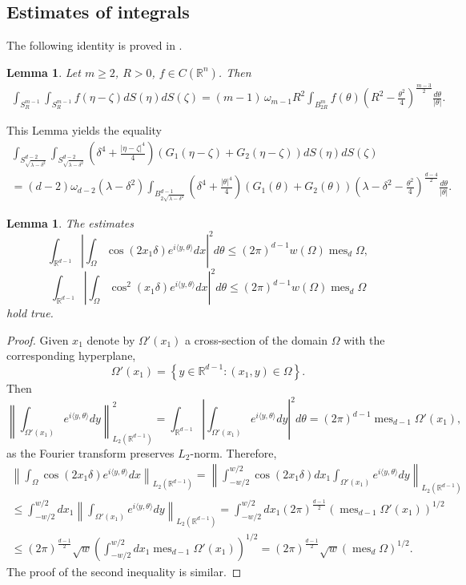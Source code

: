 \documentclass[a4paper,12pt]{article}
\numberwithin{equation}{section}
\def \de{\delta}
\def \ze{\zeta}
\def \la{\lambda}
\def \te{\theta}
\def \oo{\omega}
\def \O{\Omega}
\def \R{\mathbb{R}}
\def\mes{\operatorname{mes}}
\newcommand{\<}{\langle}
\renewcommand{\>}{\rangle}
\theoremstyle{plain}
\newtheorem{lemma}[theorem]{\bf Lemma}
\theoremstyle{definition}
\theoremstyle{remark}
\renewcommand{\le}{\leqslant}
\renewcommand{\ge}{\geqslant}
\begin{document}
\subsection{Estimates of integrals}
The following identity is proved in \cite[Lemma 5.2]{FilSaf}.

\begin{lemma}
Let $m \ge 2$, $R>0$, $f \in C(\R^n)$.
Then
\begin{eqnarray*}
\int_{S_R^{m-1}} \int_{S_R^{m-1}} f (\eta-\ze) dS (\eta) dS (\ze) 
= (m-1)\, \oo_{m-1} R^2 \int_{B_{2R}^m} f(\te) \left(R^2 - \frac{\te^2}4\right)^{\frac{m-3}2}
\frac{d\te}{|\te|} .
\end{eqnarray*}
\end{lemma}

This Lemma yields the equality
\begin{eqnarray}
\label{311}
\int_{S_{\sqrt{\la-\de^2}}^{d-2}} \int_{S_{\sqrt{\la-\de^2}}^{d-2}}
\left(\de^4 + \frac{|\eta-\ze|^4}4\right)
\left(G_1 (\eta-\ze) + G_2 (\eta-\ze)\right) dS (\eta) dS(\ze) \\
= (d-2) \oo_{d-2} (\la - \de^2) 
\int_{B_{2\sqrt{\la-\de^2}}^{d-1}} \left(\de^4 + \frac{|\te|^4}4\right)
\left(G_1(\te) + G_2(\te)\right) \left(\la - \de^2 - \frac{\te^2}4\right)^{\frac{d-4}2} \frac{d\te}{|\te|} .
\nonumber
\end{eqnarray}

\begin{lemma}
\label{l311}
The estimates
$$
\int_{\R^{d-1}} \left|\int_\O \cos(2x_1\de) e^{i\<y,\te\>} dx\right|^2 d\te
\le (2\pi)^{d-1} w(\O) \mes_d \O,
$$
$$
\int_{\R^{d-1}} \left|\int_\O \cos^2 (x_1\de) e^{i\<y,\te\>} dx\right|^2 d\te
\le (2\pi)^{d-1} w(\O) \mes_d \O
$$
hold true.
\end{lemma}

\begin{proof}
Given $x_1$ denote by $\O' (x_1)$ a cross-section of the domain $\O$ 
with the corresponding hyperplane,
$$
\O' (x_1) = \left\{y \in \R^{d-1} : (x_1, y) \in \O\right\}.
$$
Then
$$
\left\|\int_{\O'(x_1)} e^{i\<y,\te\>} dy\right\|_{L_2(\R^{d-1})}^2 
= \int_{\R^{d-1}} \left|\int_{\O'(x_1)} e^{i\<y,\te\>} dy\right|^2 d\te
= (2\pi)^{d-1} \mes_{d-1} \O' (x_1),
$$
as the Fourier transform preserves $L_2$-norm.
Therefore,
\begin{eqnarray*}
\left\|\int_\O \cos (2x_1\de) e^{i\<y,\te\>} dx\right\|_{L_2(\R^{d-1})}
= \left\|\int_{-w/2}^{w/2} \cos (2x_1\de) dx_1 
\int_{\O'(x_1)} e^{i\<y,\te\>} dy\right\|_{L_2(\R^{d-1})} \\
\le \int_{-w/2}^{w/2} dx_1 \left\|\int_{\O'(x_1)} e^{i\<y,\te\>} dy\right\|_{L_2(\R^{d-1})} 
= \int_{-w/2}^{w/2} dx_1 (2\pi)^{\frac{d-1}2} \left(\mes_{d-1} \O' (x_1)\right)^{1/2} \\
\le (2\pi)^{\frac{d-1}2} \sqrt{w} \left(\int_{-w/2}^{w/2} dx_1 \mes_{d-1} \O' (x_1)\right)^{1/2}
= (2\pi)^{\frac{d-1}2} \sqrt{w} \left(\mes_d \O\right)^{1/2}.
\end{eqnarray*}
The proof of the second inequality is similar.
\end{proof}
\end{document}
